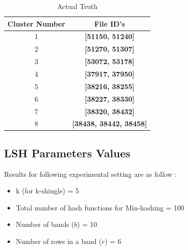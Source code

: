 \documentclass[12pt, a4paper,twoside]{article}
\begin{document}
\begin{table}[H] \label{table1}
\begin{center}
\caption{Actual Truth}
\begin{tabular}{|c|c|}
\hline
Cluster Number & File ID's\\
\hline
1              & \textbf{[51150, 51240]} \\
2              & \textbf{[51270, 51307]}\\
3              & \textbf{[53072, 53178]}\\
4              & \textbf{[37917, 37950]}\\
5              & \textbf{[38216, 38255]}\\
6              & \textbf{[38227, 38330]}\\
7              & \textbf{[38320, 38432]}\\
8              & \textbf{[38438, 38442, 38458]}\\
\hline
\end{tabular}
\end{center}
\end{table}

\subsection*{LSH Parameters Values}
Results for following  experimental setting are as follow :
\begin{itemize}
\item k (for k-shingle) = 5
\item Total number of hash functions for Min-hashing = 100
\item Number of bands ($b$) = 10
\item Number of rows in a band  ($r$) = 6
\end{itemize}
\end{document}
